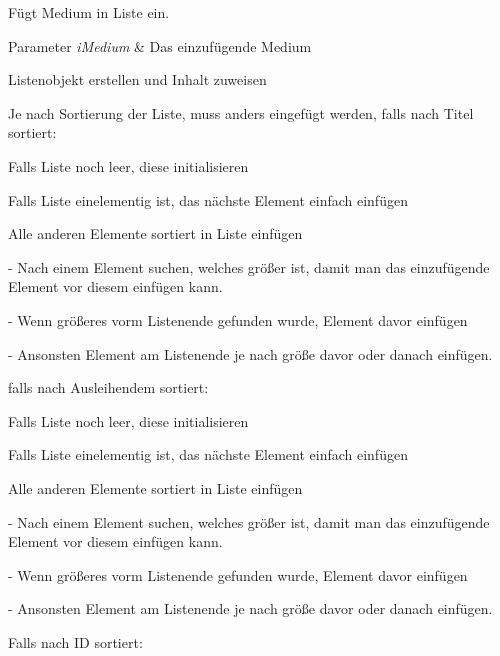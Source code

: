 Fügt Medium in Liste ein. 


\begin{DoxyParams}{Parameter}
{\em i\+Medium} & Das einzufügende Medium \\
\hline
\end{DoxyParams}

\begin{DoxyItemize}
\item Listenobjekt erstellen und Inhalt zuweisen
\end{DoxyItemize}

Je nach Sortierung der Liste, muss anders eingefügt werden, falls nach Titel sortiert\+:


\begin{DoxyItemize}
\item Falls Liste noch leer, diese initialisieren
\item Falls Liste einelementig ist, das nächste Element einfach einfügen
\item Alle anderen Elemente sortiert in Liste einfügen
\item -\/ Nach einem Element suchen, welches größer ist, damit man das einzufügende Element vor diesem einfügen kann.
\item -\/ Wenn größeres vorm Listenende gefunden wurde, Element davor einfügen
\item -\/ Ansonsten Element am Listenende je nach größe davor oder danach einfügen.
\end{DoxyItemize}

falls nach Ausleihendem sortiert\+:


\begin{DoxyItemize}
\item Falls Liste noch leer, diese initialisieren
\item Falls Liste einelementig ist, das nächste Element einfach einfügen
\item Alle anderen Elemente sortiert in Liste einfügen
\item -\/ Nach einem Element suchen, welches größer ist, damit man das einzufügende Element vor diesem einfügen kann.
\item -\/ Wenn größeres vorm Listenende gefunden wurde, Element davor einfügen
\item -\/ Ansonsten Element am Listenende je nach größe davor oder danach einfügen.
\end{DoxyItemize}

Falls nach ID sortiert\+:


